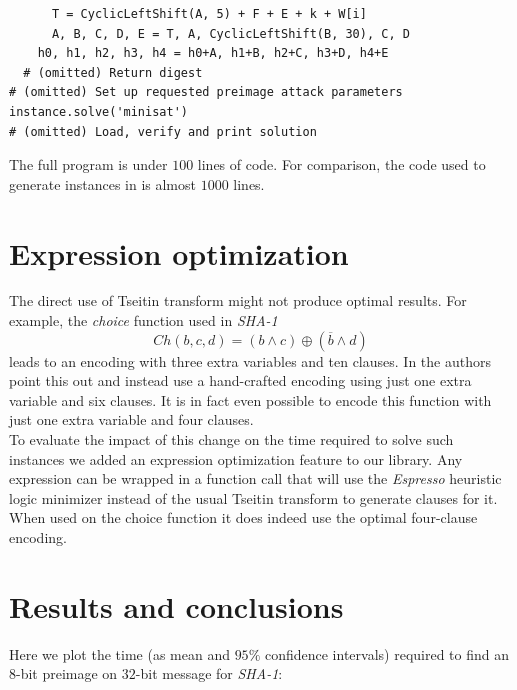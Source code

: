 \documentclass[myposter,portrait]{sciposter}
\def\mysection#1{
{\color{sectionCol}\section*{\sc\bfseries #1}}}
\begin{document}
\begin{multicols*}{3}
\begin{verbatim}
      T = CyclicLeftShift(A, 5) + F + E + k + W[i]
      A, B, C, D, E = T, A, CyclicLeftShift(B, 30), C, D
    h0, h1, h2, h3, h4 = h0+A, h1+B, h2+C, h3+D, h4+E
  # (omitted) Return digest
# (omitted) Set up requested preimage attack parameters
instance.solve('minisat')
# (omitted) Load, verify and print solution
\end{verbatim}
The full program is under $100$ lines of code.
For comparison, the code used to generate instances in \cite{nossum2012sat} is almost $1000$ lines.


\columnbreak
\mysection{Expression optimization}
The direct use of Tseitin transform might not produce optimal results.
For example, the \emph{choice} function used in \emph{SHA-1}
\[
Ch(b, c, d) = (b \land c) \oplus (\overline{b} \land d)
\]
leads to an encoding with three extra variables and ten clauses.
In \cite{nossum2012sat} the authors point this out and instead use a hand-crafted encoding using just one extra variable and six clauses.
It is in fact even possible to encode this function with just one extra variable and four clauses.
~\\

To evaluate the impact of this change on the time required to solve such instances we added an expression optimization feature to our library.
Any expression can be wrapped in a function call that will use the \emph{Espresso} heuristic logic minimizer instead of the usual Tseitin transform to generate clauses for it.
When used on the choice function it does indeed use the optimal four-clause encoding.
%
%
%

\mysection{Results and conclusions}
Here we plot the time (as mean and $95\%$ confidence intervals) required to find an $8$-bit preimage on $32$-bit message for \emph{SHA-1}:


\end{multicols*}
\end{document}

